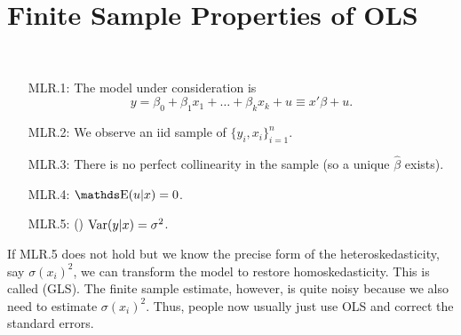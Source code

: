 \documentclass[letterpaper, 10pt]{article}
\begin{document}
\section{Finite Sample Properties of OLS}
\begin{assumption}~
  \begin{enumerate}
    \item[MLR.1:] The model under consideration is
      \[
        y = \beta_0 + \beta_1 x_1 + \dots + \beta_k x_k + u
        \equiv x' \beta + u.
      \]
    \item[MLR.2:] We observe an iid sample of \(\{y_i, x_i\}_{i = 1}^n\).
    \item[MLR.3:] There is no perfect collinearity in the sample (so a unique \(\hat{\beta}\) exists).
    \item[MLR.4:] \(\E(u|x) = 0\).
    \item[MLR.5:] () \(\operatorname{Var}(y|x) = \sigma^2\).
  \end{enumerate}
\end{assumption}
\begin{remark}
  If MLR.5 does not hold but we know the precise form of the heteroskedasticity, say \(\sigma(x_i)^2\), we can transform the model to restore homoskedasticity.
  This is called  (GLS).
  The finite sample estimate, however, is quite noisy because we also need to estimate \(\sigma(x_i)^2\).
  Thus, people now usually just use OLS and correct the standard errors.
\end{remark}
\end{document}
